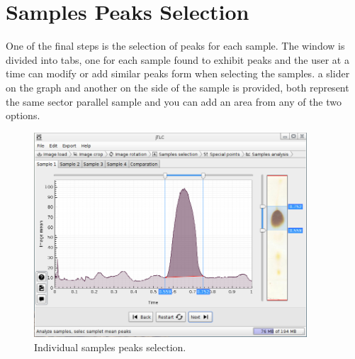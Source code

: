 \section{Samples Peaks Selection}
One of the final steps is the selection of peaks for each sample. The window is divided into tabs, one for each sample found to exhibit peaks and the user at a time can modify or add similar peaks form when selecting the samples. a slider on the graph and another on the side of the sample is provided, both represent the same sector parallel sample and you can add an area from any of the two options.
\begin{figure}[H]
	\vspace{0cm}
	\centering
	\includegraphics[width=385px]{imagenes/analysis}
	\centering
	\vspace{-0.4cm}
	\caption{Individual samples peaks selection.}
	\label{fig:image_samples_peaks}
	\vspace{-0.25cm}
\end{figure}

